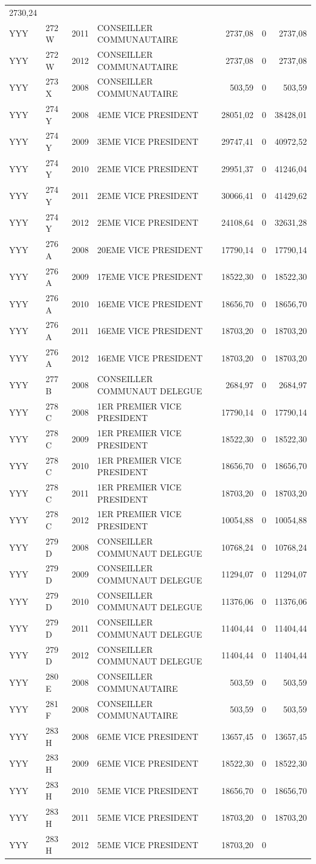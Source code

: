 \begin{longtable}[]{@{}llrlrrr@{}}
2730,24\tabularnewline
YYY & 272 W & 2011 & CONSEILLER COMMUNAUTAIRE & 2737,08 & 0 &
2737,08\tabularnewline
YYY & 272 W & 2012 & CONSEILLER COMMUNAUTAIRE & 2737,08 & 0 &
2737,08\tabularnewline
YYY & 273 X & 2008 & CONSEILLER COMMUNAUTAIRE & 503,59 & 0 &
503,59\tabularnewline
YYY & 274 Y & 2008 & 4EME VICE PRESIDENT & 28051,02 & 0 &
38428,01\tabularnewline
YYY & 274 Y & 2009 & 3EME VICE PRESIDENT & 29747,41 & 0 &
40972,52\tabularnewline
YYY & 274 Y & 2010 & 2EME VICE PRESIDENT & 29951,37 & 0 &
41246,04\tabularnewline
YYY & 274 Y & 2011 & 2EME VICE PRESIDENT & 30066,41 & 0 &
41429,62\tabularnewline
YYY & 274 Y & 2012 & 2EME VICE PRESIDENT & 24108,64 & 0 &
32631,28\tabularnewline
YYY & 276 A & 2008 & 20EME VICE PRESIDENT & 17790,14 & 0 &
17790,14\tabularnewline
YYY & 276 A & 2009 & 17EME VICE PRESIDENT & 18522,30 & 0 &
18522,30\tabularnewline
YYY & 276 A & 2010 & 16EME VICE PRESIDENT & 18656,70 & 0 &
18656,70\tabularnewline
YYY & 276 A & 2011 & 16EME VICE PRESIDENT & 18703,20 & 0 &
18703,20\tabularnewline
YYY & 276 A & 2012 & 16EME VICE PRESIDENT & 18703,20 & 0 &
18703,20\tabularnewline
YYY & 277 B & 2008 & CONSEILLER COMMUNAUT DELEGUE & 2684,97 & 0 &
2684,97\tabularnewline
YYY & 278 C & 2008 & 1ER PREMIER VICE PRESIDENT & 17790,14 & 0 &
17790,14\tabularnewline
YYY & 278 C & 2009 & 1ER PREMIER VICE PRESIDENT & 18522,30 & 0 &
18522,30\tabularnewline
YYY & 278 C & 2010 & 1ER PREMIER VICE PRESIDENT & 18656,70 & 0 &
18656,70\tabularnewline
YYY & 278 C & 2011 & 1ER PREMIER VICE PRESIDENT & 18703,20 & 0 &
18703,20\tabularnewline
YYY & 278 C & 2012 & 1ER PREMIER VICE PRESIDENT & 10054,88 & 0 &
10054,88\tabularnewline
YYY & 279 D & 2008 & CONSEILLER COMMUNAUT DELEGUE & 10768,24 & 0 &
10768,24\tabularnewline
YYY & 279 D & 2009 & CONSEILLER COMMUNAUT DELEGUE & 11294,07 & 0 &
11294,07\tabularnewline
YYY & 279 D & 2010 & CONSEILLER COMMUNAUT DELEGUE & 11376,06 & 0 &
11376,06\tabularnewline
YYY & 279 D & 2011 & CONSEILLER COMMUNAUT DELEGUE & 11404,44 & 0 &
11404,44\tabularnewline
YYY & 279 D & 2012 & CONSEILLER COMMUNAUT DELEGUE & 11404,44 & 0 &
11404,44\tabularnewline
YYY & 280 E & 2008 & CONSEILLER COMMUNAUTAIRE & 503,59 & 0 &
503,59\tabularnewline
YYY & 281 F & 2008 & CONSEILLER COMMUNAUTAIRE & 503,59 & 0 &
503,59\tabularnewline
YYY & 283 H & 2008 & 6EME VICE PRESIDENT & 13657,45 & 0 &
13657,45\tabularnewline
YYY & 283 H & 2009 & 6EME VICE PRESIDENT & 18522,30 & 0 &
18522,30\tabularnewline
YYY & 283 H & 2010 & 5EME VICE PRESIDENT & 18656,70 & 0 &
18656,70\tabularnewline
YYY & 283 H & 2011 & 5EME VICE PRESIDENT & 18703,20 & 0 &
18703,20\tabularnewline
YYY & 283 H & 2012 & 5EME VICE PRESIDENT & 18703,20 & 0 &

\end{longtable}
